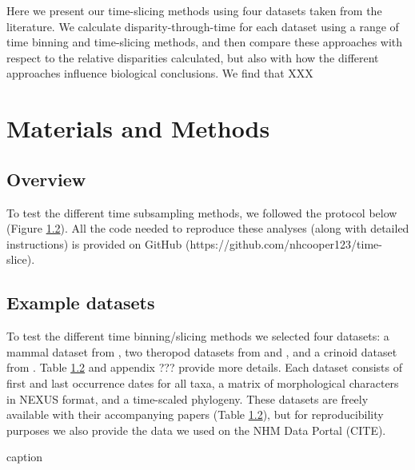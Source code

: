 \documentclass[12pt,a4paper]{article}
\begin{document}
Here we present our time-slicing methods using four datasets taken from the literature.
We calculate disparity-through-time for each dataset using a range of time binning and time-slicing methods, and then compare these approaches with respect to the relative disparities calculated, but also with how the different approaches influence biological conclusions. We find that XXX

\section{Materials and Methods}
\subsection{Overview}
\label{overview-section}
To test the different time subsampling methods, we followed the protocol below (Figure \ref{datasets}). 
All the code needed to reproduce these analyses (along with detailed instructions) is provided on GitHub (https://github.com/nhcooper123/time-slice). 



\subsection{Example datasets}
\label{datasets}
To test the different time binning/slicing methods we selected four datasets: a mammal dataset from \cite{beckancient2014}, two theropod datasets from \cite{brusatte2014gradual} and \cite{bapst2016topology}, and a crinoid dataset from \cite{wright2017bayesian}.
Table \ref{datasets} and appendix ??? provide more details. %
Each dataset consists of first and last occurrence dates for all taxa, a matrix of morphological characters in NEXUS format, and a time-scaled phylogeny. 
These datasets are freely available with their accompanying papers (Table \ref{datasets}), but for reproducibility purposes we also provide the data we used on the NHM Data Portal (CITE).

  \begin{table}[!htbp]      
    \caption[Datasets.]{caption}
     
    \label{datasets}  
  \end{table}
\end{document}
